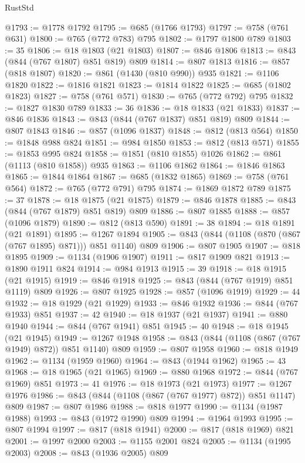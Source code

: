 \begin{lexlean}{RustStd}
\begin{coremodule}
@1793 := @1778 @1792
@1795 := @685 (@1766 @1793)
@1797 := @758 (@761 @631)
@1800 := @765 (@772 @783) @795
@1802 := @1797 @1800 @789
@1803 := 35
@1806 := @18 @1803 (@21 @1803)
@1807 := @846 @1806
@1813 := @843 (@844 (@767 @1807) @851 @819) @809
@1814 := @807 @1813
@1816 := @857 (@818 @1807)
@1820 := @861 (@1430 (@810 @990)) @935
@1821 := @1106 @1820
@1822 := @1816 @1821
@1823 := @1814 @1822
@1825 := @685 (@1802 @1823)
@1827 := @758 (@761 @571)
@1830 := @765 (@772 @792) @795
@1832 := @1827 @1830 @789
@1833 := 36
@1836 := @18 @1833 (@21 @1833)
@1837 := @846 @1836
@1843 := @843 (@844 (@767 @1837) @851 @819) @809
@1844 := @807 @1843
@1846 := @857 (@1096 @1837)
@1848 := @812 (@813 @564)
@1850 := @1848 @988 @824
@1851 := @984 @1850
@1853 := @812 (@813 @571)
@1855 := @1853 @995 @824
@1858 := @1851 (@810 @1855) @1026
@1862 := @861 (@1113 (@810 @1858)) @935
@1863 := @1106 @1862
@1864 := @1846 @1863
@1865 := @1844 @1864
@1867 := @685 (@1832 @1865)
@1869 := @758 (@761 @564)
@1872 := @765 (@772 @791) @795
@1874 := @1869 @1872 @789
@1875 := 37
@1878 := @18 @1875 (@21 @1875)
@1879 := @846 @1878
@1885 := @843 (@844 (@767 @1879) @851 @819) @809
@1886 := @807 @1885
@1888 := @857 (@1096 @1879)
@1890 := @812 (@813 @590)
@1891 := 38
@1894 := @18 @1891 (@21 @1891)
@1895 := @1267 @1894
@1905 := @843 (@844 (@1108 (@870 (@867 (@767 @1895) @871))) @851 @1140) @809
@1906 := @807 @1905
@1907 := @818 @1895
@1909 := @1134 (@1906 @1907)
@1911 := @817 @1909 @821
@1913 := @1890 @1911 @824
@1914 := @984 @1913
@1915 := 39
@1918 := @18 @1915 (@21 @1915)
@1919 := @846 @1918
@1925 := @843 (@844 (@767 @1919) @851 @1119) @809
@1926 := @807 @1925
@1928 := @857 (@1096 @1919)
@1929 := 44
@1932 := @18 @1929 (@21 @1929)
@1933 := @846 @1932
@1936 := @844 (@767 @1933) @851
@1937 := 42
@1940 := @18 @1937 (@21 @1937)
@1941 := @880 @1940
@1944 := @844 (@767 @1941) @851
@1945 := 40
@1948 := @18 @1945 (@21 @1945)
@1949 := @1267 @1948
@1958 := @843 (@844 (@1108 (@867 (@767 @1949) @872)) @851 @1140) @809
@1959 := @807 @1958
@1960 := @818 @1949
@1962 := @1134 (@1959 @1960)
@1964 := @843 (@1944 @1962)
@1965 := 43
@1968 := @18 @1965 (@21 @1965)
@1969 := @880 @1968
@1972 := @844 (@767 @1969) @851
@1973 := 41
@1976 := @18 @1973 (@21 @1973)
@1977 := @1267 @1976
@1986 := @843 (@844 (@1108 (@867 (@767 @1977) @872)) @851 @1147) @809
@1987 := @807 @1986
@1988 := @818 @1977
@1990 := @1134 (@1987 @1988)
@1993 := @843 (@1972 @1990) @809
@1994 := @1964 @1993
@1995 := @807 @1994
@1997 := @817 (@818 @1941)
@2000 := @817 (@818 @1969) @821
@2001 := @1997 @2000
@2003 := @1155 @2001 @824
@2005 := @1134 (@1995 @2003)
@2008 := @843 (@1936 @2005) @809

\end{coremodule}
\end{lexlean}
